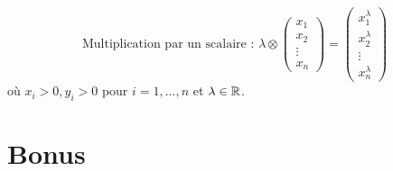 \begin{exercice}
\begin{enumerate}
        $$\text{Multiplication par un scalaire : } \lambda \otimes \begin{pmatrix}
            x_1 \\ x_2 \\ \vdots \\ x_n
        \end{pmatrix} =
        \begin{pmatrix}
            x_1^{\lambda} \\ x_2^{\lambda} \\ \vdots \\ x_n^{\lambda}
        \end{pmatrix}$$
    où $x_i > 0, y_i > 0$ pour $i = 1, ..., n$ et $\lambda \in \mathbb{R}$. \\
    
\end{enumerate}
\end{exercice}

\section*{Bonus}

